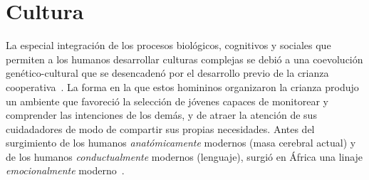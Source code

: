 \documentclass[a4paper,10pt]{book}
\theoremstyle{definition}
\newif\ifes
\newcommand{\es}[1]{\ifes#1\fi}
\begin{document}
% 
% 

\section{Cultura}

La especial integraci\'on de los procesos biol\'ogicos, cognitivos y sociales que permiten a los humanos desarrollar culturas complejas se debió a una coevolución genético-cultural que se desencadenó por el desarrollo previo de la crianza cooperativa~\cite{hrdy2020-emotionallyModern}.
La forma en la que estos homininos organizaron la crianza produjo un ambiente que favoreció la selección de jóvenes capaces de monitorear y comprender las intenciones de los demás, y de atraer la atención de sus cuidadadores de modo de compartir sus propias necesidades.
Antes del surgimiento de los humanos \emph{anatómicamente} modernos (masa cerebral actual) y de los humanos \emph{conductualmente} modernos (lenguaje), surgió en África una linaje \emph{emocionalmente} moderno~\cite{hrdy2020-emotionallyModern}.
\end{document}
